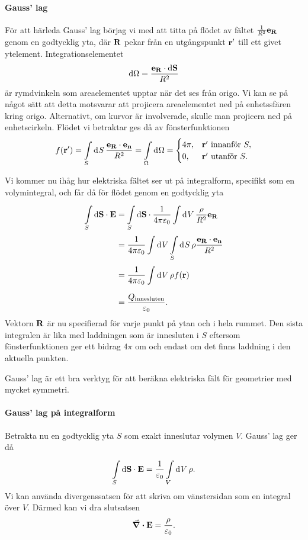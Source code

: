 \paragraph{Gauss' lag}
För att härleda Gauss' lag börjag vi med att titta på flödet av fältet $\frac{1}{R^{2}}\vb{e}_{\vb{R}}$ genom en godtycklig yta, där $\vb{R}$ pekar från en utgångspunkt $\vb{r}'$ till ett givet ytelement. Integrationselementet
\begin{align*}
	\dd{\Omega} = \frac{\vb{e}_{\vb{R}}\cdot\vb{\dd{S}}}{R^{2}}
\end{align*}
är rymdvinkeln som areaelementet upptar när det ses från origo. Vi kan se på något sätt att detta motsvarar att projicera areaelementet ned på enhetssfären kring origo. Alternativt, om kurvor är involverade, skulle man projicera ned på enhetscirkeln. Flödet vi betraktar ges då av fönsterfunktionen
\begin{align*}
	f(\vb{r}') = \int\limits_{S}^{}\dd[]{S}\frac{\vb{e}_{\vb{R}}\cdot\vb{e}_{\vb{n}}}{R^{2}} = \int\limits_{\Omega}^{}\dd[]{\Omega} =
	\begin{cases}
		4\pi, &\vb{r}'\text{ innanför }S, \\
		0,    &\vb{r}'\text{ utanför }S.
	\end{cases}
\end{align*}

Vi kommer nu ihåg hur elektriska fältet ser ut på integralform, specifikt som en volymintegral, och får då för flödet genom en godtycklig yta
\begin{align*}
	\int\limits_{S}^{}\dd{\vb{S}}\cdot \vb{E} &= \int\limits_{S}^{}\dd{\vb{S}}\cdot \frac{1}{4\pi\varepsilon_{0}}\int\limits_{}^{}\dd[]{V}\frac{\rho}{R^{2}}\vb{e}_{\vb{R}} \\
	                      &= \frac{1}{4\pi\varepsilon_{0}}\int\limits_{}^{}\dd[]{V}\int\limits_{S}^{}\dd[]{S}\rho\frac{\vb{e}_{\vb{R}}\cdot\vb{e}_{\vb{n}}}{R^{2}} \\
	                      &= \frac{1}{4\pi\varepsilon_{0}}\int\limits_{}^{}\dd[]{V}\rho f(\vb{r}) \\
	                      &= \frac{Q_{\text{innesluten}}}{\varepsilon_{0}}.
\end{align*}
Vektorn $\vb{R}$ är nu specifierad för varje punkt på ytan och i hela rummet. Den sista integralen är lika med laddningen som är innesluten i $S$ eftersom fönsterfunktionen ger ett bidrag $4\pi$ om och endast om det finns laddning i den aktuella punkten.

Gauss' lag är ett bra verktyg för att beräkna elektriska fält för geometrier med mycket symmetri.

\paragraph{Gauss' lag på integralform}
Betrakta nu en godtycklig yta $S$ som exakt inneslutar volymen $V$. Gauss' lag ger då
\begin{align*}
	\int\limits_{S}^{}\dd{\vb{S}}\cdot \vb{E} = \frac{1}{\varepsilon_{0}}\int\limits_{V}^{}\dd[]{V}\rho.
\end{align*}
Vi kan använda divergenssatsen för att skriva om vänstersidan som en integral över $V$. Därmed kan vi dra slutsatsen
\begin{align*}
	\div{\vb{E}} = \frac{\rho}{\varepsilon_{0}}.
\end{align*}

